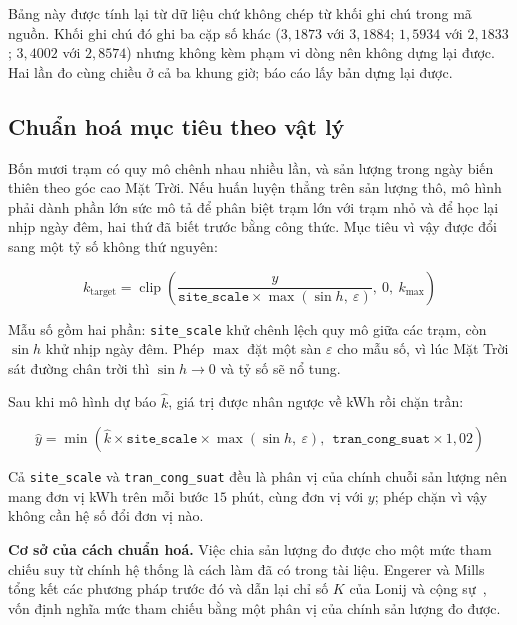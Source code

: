 \documentclass[12pt, a4paper]{report}
\begin{document}
Bảng này được tính lại từ dữ liệu chứ không chép từ khối ghi chú trong mã nguồn. Khối ghi chú
đó ghi ba cặp số khác ($3{,}1873$ với $3{,}1884$; $1{,}5934$ với $2{,}1833$; $3{,}4002$ với
$2{,}8574$) nhưng không kèm phạm vi dòng nên không dựng lại được. Hai lần đo cùng chiều ở cả ba
khung giờ; báo cáo lấy bản dựng lại được.

\FloatBarrier
\subsection{Chuẩn hoá mục tiêu theo vật lý}

Bốn mươi trạm có quy mô chênh nhau nhiều lần, và sản lượng trong ngày biến thiên theo góc cao
Mặt Trời. Nếu huấn luyện thẳng trên sản lượng thô, mô hình phải dành phần lớn sức mô tả để
phân biệt trạm lớn với trạm nhỏ và để học lại nhịp ngày đêm, hai thứ đã biết trước bằng
công thức. Mục tiêu vì vậy được đổi sang một tỷ số không thứ nguyên:

\begin{equation}
k_{\text{target}} = \operatorname{clip}\!\left(
\frac{y}{\texttt{site\_scale} \times \max(\sin h,\ \varepsilon)},\ 0,\ k_{\max}\right)
\end{equation}

Mẫu số gồm hai phần: \texttt{site\_scale} khử chênh lệch quy mô giữa các trạm, còn $\sin h$ khử
nhịp ngày đêm. Phép $\max$ đặt một sàn $\varepsilon$ cho mẫu số, vì lúc Mặt Trời sát đường
chân trời thì $\sin h \to 0$ và tỷ số sẽ nổ tung.

Sau khi mô hình dự báo $\hat{k}$, giá trị được nhân ngược về kWh rồi chặn trần:

\begin{equation}
\hat{y} = \min\!\left(
\hat{k} \times \texttt{site\_scale} \times \max(\sin h,\ \varepsilon),\ \
\texttt{tran\_cong\_suat} \times 1{,}02\right)
\end{equation}

Cả \texttt{site\_scale} và \texttt{tran\_cong\_suat} đều là phân vị của chính chuỗi sản lượng nên
mang đơn vị kWh trên mỗi bước $15$ phút, cùng đơn vị với $y$; phép chặn vì vậy không cần hệ số
đổi đơn vị nào.

\textbf{Cơ sở của cách chuẩn hoá.} Việc chia sản lượng đo được cho một mức tham chiếu suy từ
chính hệ thống là cách làm đã có trong tài liệu. Engerer và Mills~\cite{engerer2014kpv} tổng
kết các phương pháp trước đó và dẫn lại chỉ số $K$ của Lonij và cộng sự~\cite{lonij2012tucson},
vốn định nghĩa mức tham chiếu bằng một phân vị của chính sản lượng đo được.
\end{document}
